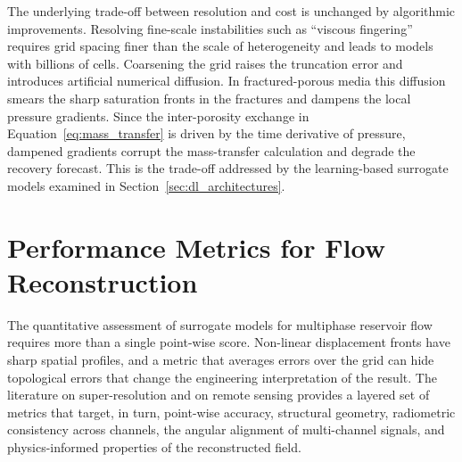 The underlying trade-off between resolution and cost is unchanged by algorithmic improvements. Resolving fine-scale instabilities such as \enquote{viscous fingering} requires grid spacing finer than the scale of heterogeneity and leads to models with billions of cells. Coarsening the grid raises the truncation error and introduces artificial numerical diffusion. In fractured-porous media this diffusion smears the sharp saturation fronts in the fractures and dampens the local pressure gradients. Since the inter-porosity exchange in Equation~\ref{eq:mass_transfer} is driven by the time derivative of pressure, dampened gradients corrupt the mass-transfer calculation and degrade the recovery forecast. This is the trade-off addressed by the learning-based surrogate models examined in Section~\ref{sec:dl_architectures}.


\section{Performance Metrics for Flow Reconstruction}
\label{sec:metrics}

The quantitative assessment of surrogate models for multiphase reservoir flow requires more than a single point-wise score. Non-linear displacement fronts have sharp spatial profiles, and a metric that averages errors over the grid can hide topological errors that change the engineering interpretation of the result. The literature on super-resolution and on remote sensing provides a layered set of metrics that target, in turn, point-wise accuracy, structural geometry, radiometric consistency across channels, the angular alignment of multi-channel signals, and physics-informed properties of the reconstructed field.

